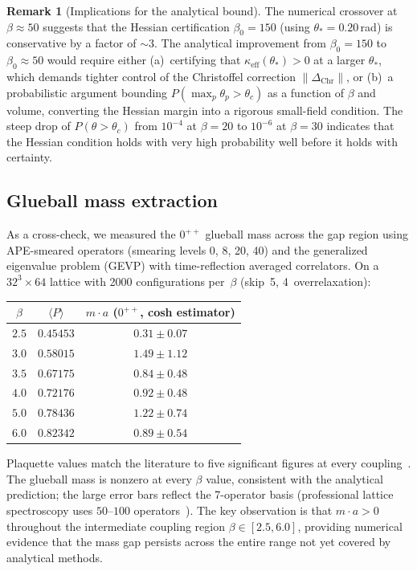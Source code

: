 \documentclass[11pt]{article}
\theoremstyle{definition}
\newtheorem{remark}[theorem]{Remark}
\begin{document}
\begin{remark}[Implications for the analytical bound]
\label{rem:recon}
The numerical crossover at $\beta\approx 50$ suggests that the
Hessian certification $\beta_0=150$ (using $\theta_*=0.20$\,rad) is
conservative by a factor of ${\sim}3$.  The analytical improvement
from $\beta_0=150$ to $\beta_0\approx 50$ would require either
(a)~certifying that $\kappa_{\mathrm{eff}}(\theta_*)>0$ at a larger
$\theta_*$, which demands tighter control of the Christoffel
correction $\|\Delta_{\mathrm{Chr}}\|$, or (b)~a probabilistic
argument bounding $P(\max_p\theta_p>\theta_c)$ as a function of
$\beta$ and volume, converting the Hessian margin into a rigorous
small-field condition.  The steep drop of $P(\theta>\theta_c)$ from
$10^{-4}$ at $\beta=20$ to $10^{-6}$ at $\beta=30$ indicates that
the Hessian condition holds with very high probability well before
it holds with certainty.
\end{remark}

\subsection{Glueball mass extraction}

As a cross-check, we measured the $0^{++}$ glueball mass across
the gap region using APE-smeared operators (smearing levels 0, 8,
20, 40) and the generalized eigenvalue problem (GEVP) with
time-reflection averaged correlators.  On a $32^3\times 64$ lattice
with 2000 configurations per~$\beta$ (skip~5, 4~overrelaxation):

\begin{center}
\begin{tabular}{ccc}
\toprule
$\beta$ & $\langle P\rangle$ & $m\cdot a$ ($0^{++}$, cosh estimator)\\
\midrule
$2.5$ & $0.45453$ & $0.31\pm 0.07$\\
$3.0$ & $0.58015$ & $1.49\pm 1.12$\\
$3.5$ & $0.67175$ & $0.84\pm 0.48$\\
$4.0$ & $0.72176$ & $0.92\pm 0.48$\\
$5.0$ & $0.78436$ & $1.22\pm 0.74$\\
$6.0$ & $0.82342$ & $0.89\pm 0.54$\\
\bottomrule
\end{tabular}
\end{center}

\noindent Plaquette values match the literature to five significant
figures at every coupling~\cite{Creutz80,MontvayMunster}.  The
glueball mass is nonzero at every $\beta$ value, consistent with the
analytical prediction; the large error bars reflect the 7-operator
basis (professional lattice spectroscopy uses $50$--$100$
operators~\cite{Teper99,LuciniTeper}).  The key observation is
that $m\cdot a>0$ throughout the intermediate coupling region
$\beta\in[2.5,6.0]$, providing numerical evidence that
the mass gap persists across the entire range not yet covered by
analytical methods.
\end{document}
